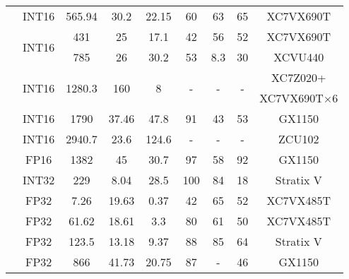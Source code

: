 \begin{table}[htbp]
\begin{tabular}{r|c|c|c|c|ccc|c}
            \cite{li2016high}           & INT16     & 565.94    & 30.2  & 22.15 & 60    & 63    & 65    & XC7VX690T \\ 
            \multirow{2}[2]{*}{\cite{Shen2018Towards}} & \multirow{2}[2]{*}{INT16} & 431  & 25 & 17.1  & 42 & 56 & 52    & XC7VX690T \\ %
             &  & 785 & 26 & 30.2 & 53 & 8.3  & 30 & XCVU440 \\ %
            \multirow{2}[2]{*}{\cite{zhang2016energy}} & \multirow{2}[0]{*}{INT16} & \multirow{2}[0]{*}{1280.3} & \multirow{2}[0]{*}{160} & \multirow{2}[0]{*}{8} & \multirow{2}[0]{*}{-} & \multirow{2}[0]{*}{-} & \multirow{2}[0]{*}{-} & XC7Z020+ \\
            &       &       &       &       &       &       &       & XC7VX690T$\times$6 \\ %
            \cite{zhang2017improving}   & INT16     & 1790      & 37.46 & 47.8  & 91    & 43    & 53    & GX1150 \\ %
            \cite{lu2017evaluating}     & INT16     & 2940.7    & 23.6  & 124.6 &   -   &   -   &   -   & ZCU102 \\ %
            \cite{aydonat2017opencl}    & FP16      & 1382      & 45    & 30.7  & 97    & 58    & 92    & GX1150 \\ %
            \cite{podili2017fast}       & INT32     & 229       & 8.04  & 28.5  & 100   & 84    & 18    & Stratix V \\ %
            \cite{guan2017fpga}         & FP32      & 7.26      & 19.63 & 0.37  & 42    & 65    & 52    & XC7VX485T \\ %
            \cite{zhang2015optimizing}  & FP32      & 61.62     & 18.61 & 3.3   & 80    & 61    & 50    & XC7VX485T \\ %
            \cite{zhang2017frequency}   & FP32      & 123.5     & 13.18 & 9.37  & 88    & 85    & 64    & Stratix V \\ %
            \cite{zhang2017improving}   & FP32      & 866       & 41.73 & 20.75 & 87    & -     & 46    & GX1150 \\ 
            \bottomrule
        \end{tabular}%
    \label{tab:hardware_list}%
  \end{table}%